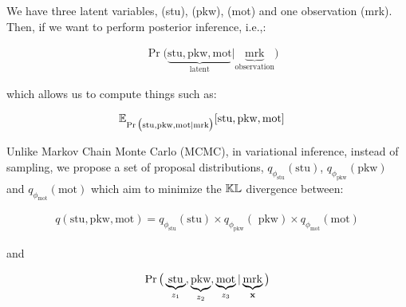\documentclass{article}
\begin{document}
We have three latent variables, (stu), (pkw), (mot) and one observation (mrk). Then, if we want to perform posterior inference, i.e.,:

\begin{equation}\begin{split}
&\Pr \big(\underbrace{\text{stu},\text{pkw},\text{mot}}_{\text{latent}} | \underbrace{\text{mrk}}_{\text{observation}}\big)
\end{split}\end{equation}

which allows us to compute things such as:

\begin{equation}\begin{split}
&\mathbb{E}_{ \Pr \big(\text{stu},\text{pkw},\text{mot} | \text{mrk} \big)} [ \text{stu},\text{pkw},\text{mot}  ]
\end{split}\end{equation}



Unlike Markov Chain Monte Carlo (MCMC), in variational inference, instead of sampling, we propose a set of proposal distributions, $q_{\phi_\text{stu}}(\text{stu})$, $q_{\phi_\text{pkw}}(\text{pkw})$ and $q_{\phi_\text{mot}}(\text{mot})$ which aim to minimize the $\mathbb{KL}$ divergence between:


\begin{equation}\begin{split}
q(\text {stu}, \text{pkw}, \text{mot}) = q_{\phi_\text{stu}}(\text{stu}) \times q_{\phi_\text{pkw}}(\text{ pkw}) \times q_{\phi_\text{mot}}(\text{mot})
\end{split}\end{equation}

and 

\begin{equation}\begin{split}
\Pr \big(\underbrace{\text{stu}}_{z_1},\underbrace{\text{pkw}}_{z_2},\underbrace{\text{mot}}_{z_3} | \underbrace{\text {mrk}}_{{\mathbf x}} \big)\\
\end{split}\end{equation}
\end{document}
